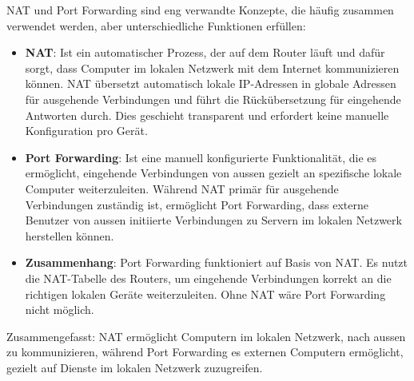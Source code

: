 \begin{myremark}
\gls{NAT} und Port Forwarding sind eng verwandte Konzepte, die häufig zusammen verwendet werden, aber unterschiedliche Funktionen erfüllen:

\begin{itemize}
	\item \textbf{\gls{NAT}}: Ist ein automatischer Prozess, der auf dem Router läuft und dafür sorgt, dass Computer im lokalen Netzwerk mit dem Internet kommunizieren können. \gls{NAT} übersetzt automatisch lokale \gls{IP}-Adressen in globale Adressen für ausgehende Verbindungen und führt die Rückübersetzung für eingehende Antworten durch. Dies geschieht transparent und erfordert keine manuelle Konfiguration pro Gerät.

	\item \textbf{Port Forwarding}: Ist eine manuell konfigurierte Funktionalität, die es ermöglicht, eingehende Verbindungen von aussen gezielt an spezifische lokale Computer weiterzuleiten. Während \gls{NAT} primär für ausgehende Verbindungen zuständig ist, ermöglicht Port Forwarding, dass externe Benutzer von aussen initiierte Verbindungen zu Servern im lokalen Netzwerk herstellen können.

	\item \textbf{Zusammenhang}: Port Forwarding funktioniert auf Basis von \gls{NAT}. Es nutzt die \gls{NAT}-Tabelle des Routers, um eingehende Verbindungen korrekt an die richtigen lokalen Geräte weiterzuleiten. Ohne \gls{NAT} wäre Port Forwarding nicht möglich.
\end{itemize}

Zusammengefasst: \gls{NAT} ermöglicht Computern im lokalen Netzwerk, nach aussen zu kommunizieren, während Port Forwarding es externen Computern ermöglicht, gezielt auf Dienste im lokalen Netzwerk zuzugreifen.
\end{myremark}